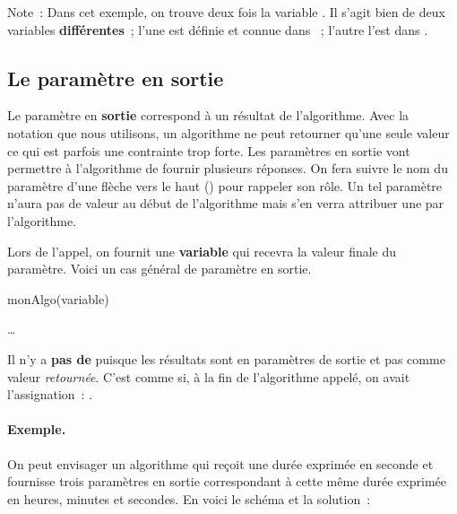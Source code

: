 		Note~: Dans cet exemple, on trouve deux fois la variable .
		Il s’agit bien de deux variables \textbf{différentes}~;
		l’une est définie et connue dans ~;
		l’autre l’est dans .
		
	\subsection{Le paramètre en sortie}

		Le paramètre en \textbf{sortie}
		correspond à un résultat de l’algorithme.
		Avec la notation que nous utilisons,
		un algorithme ne peut retourner qu’une seule valeur
		ce qui est parfois une contrainte trop forte.
		Les paramètres en sortie vont permettre à l’algorithme
		de fournir plusieurs réponses.
		On fera suivre le nom du paramètre d’une flèche
		vers le haut (\Out) pour rappeler son rôle.
		Un tel paramètre n’aura pas de valeur
		au début de l’algorithme mais s’en verra attribuer une
		par l’algorithme.
		
		Lors de l’appel, on fournit une \textbf{variable}
		qui recevra la valeur finale du paramètre.
		Voici un cas général de paramètre en sortie.
		
		\begin{minipage}{4cm}
			\begin{LDA}
				\Stmt monAlgo(variable)
				\Empty
			\end{LDA}
		\end{minipage}
		\quad
		\begin{minipage}{8cm}
			\begin{LDA}
				\LComment {Code appelé}
				\Entete{monAlgo}{\Par{par\Out}{entier}}{}
				\Stmt \dots
			\end{LDA}
		\end{minipage}

		Il n’y a \textbf{pas de \lda{\algorithmicreturn}}
		puisque les résultats sont en paramètres de sortie et pas comme
		valeur \emph{retournée}.
		C’est comme si,
		à la fin de l’algorithme appelé,
		on avait l’assignation~:
		.
		
		\paragraph{Exemple.}
		On peut envisager un algorithme
		qui reçoit une durée exprimée en seconde
		et fournisse trois paramètres en sortie
		correspondant à cette même durée exprimée en heures, minutes et secondes.
		En voici le schéma et la solution~:
		\begin{center}
		\end{center}
			

